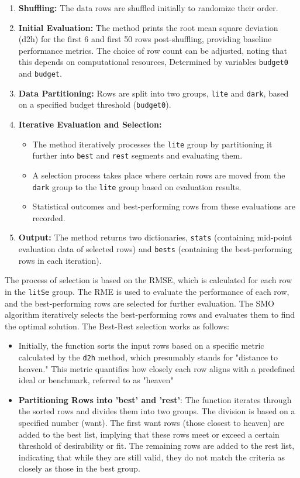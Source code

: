 \documentclass{ieeeaccess}
\begin{document}
\begin{enumerate}
    \item \textbf{Shuffling:} The data rows are shuffled initially to randomize their order.
    \item \textbf{Initial Evaluation:} The method prints the root mean square deviation (d2h) for the first 6 and first 50 rows post-shuffling, providing baseline performance metrics. The choice of row count can be adjusted, noting that this depends on computational resources, Determined by variables \texttt{budget0} and \texttt{budget}.
    \item \textbf{Data Partitioning:} Rows are split into two groups, \texttt{lite} and \texttt{dark}, based on a specified budget threshold (\texttt{budget0}).
    \item \textbf{Iterative Evaluation and Selection:}
        \begin{itemize}
            \item The method iteratively processes the \texttt{lite} group by partitioning it further into \texttt{best} and \texttt{rest} segments and evaluating them.
            \item A selection process takes place where certain rows are moved from the \texttt{dark} group to the \texttt{lite} group based on evaluation results.
            \item Statistical outcomes and best-performing rows from these evaluations are recorded.
        \end{itemize}
    \item \textbf{Output:} The method returns two dictionaries, \texttt{stats} (containing mid-point evaluation data of selected rows) and \texttt{bests} (containing the best-performing rows in each iteration).
\end{enumerate}

The process of selection is based on the RMSE, which is calculated for each row in the \texttt{litSe} group. The RME is used to evaluate the performance of each row, and the best-performing rows are selected for further evaluation. The SMO algorithm iteratively selects the best-performing rows and evaluates them to find the optimal solution. The Best-Rest selection works as follows:

\begin{itemize}
    \item Initially, the function sorts the input rows based on a specific metric calculated by the \texttt{d2h} method, which presumably stands for "distance to heaven." This metric quantifies how closely each row aligns with a predefined ideal or benchmark, referred to as "heaven"
    \item \textbf{Partitioning Rows into 'best' and 'rest'}:
    The function iterates through the sorted rows and divides them into two groups. The division is based on a specified number (want).
    The first want rows (those closest to heaven) are added to the best list, implying that these rows meet or exceed a certain threshold of desirability or fit.
    The remaining rows are added to the rest list, indicating that while they are still valid, they do not match the criteria as closely as those in the best group.
\end{itemize}
\end{document}
